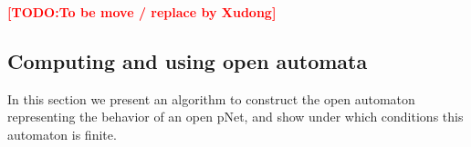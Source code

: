 \documentclass{lncs/llncs}
\newcommand{\TODO}[1]{\textcolor{red}{\textbf{[TODO:#1]}}}
\newcommand{\OTvar}{\texttt}
\begin{document}



%
%


\TODO{To be move / replace by Xudong}
\subsection{Computing and using open automata}
In this section we present an algorithm to construct the open
automaton representing the behavior of an open pNet, and show
under which conditions this automaton is finite.
\end{document}
